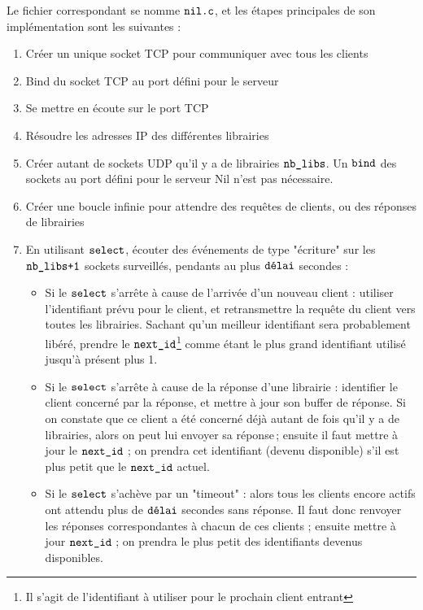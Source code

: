 \documentclass[
  french,
  twocolumn,
	9pt, %
]{fphw}
\begin{document}
\noindent Le fichier correspondant se nomme $\verb|nil.c|$, et les étapes principales de son implémentation sont les suivantes :

\begin{enumerate}
	\item Créer un unique socket TCP pour communiquer avec tous les clients
  \item Bind du socket TCP au port défini pour le serveur
  \item Se mettre en écoute sur le port TCP
  \item Résoudre les adresses IP des différentes librairies
  \item Créer autant de sockets UDP qu'il y a de librairies $\verb|nb_libs|$. Un $\verb|bind|$ des sockets au port défini pour le serveur Nil n'est pas nécessaire.
  \item Créer une boucle infinie pour attendre des requêtes de clients, ou des réponses de librairies 
	\item En utilisant $\verb|select|$, écouter des événements de type "écriture" sur les $\verb|nb_libs+1|$ sockets surveillés, pendants au plus $\verb|délai|$ secondes :
	\begin{itemize}
		\item Si le $\verb|select|$ s'arrête à cause de l'arrivée d'un nouveau client : utiliser l'identifiant prévu pour le client, et retransmettre la requête du client vers toutes les librairies. Sachant qu'un meilleur identifiant sera probablement libéré, prendre le $\verb|next_id|$\footnote{Il s'agit de l'identifiant à utiliser pour le prochain client entrant} comme étant le plus grand identifiant utilisé jusqu'à présent plus 1.
		\item Si le $\verb|select|$ s'arrête à cause de la réponse d'une librairie : identifier le client concerné par la réponse, et mettre à jour son buffer de réponse. Si on constate que ce client a été concerné déjà autant de fois qu'il y a de librairies, alors on peut lui envoyer sa réponse ; ensuite il faut mettre à jour le $\verb|next_id|$ ; on prendra cet identifiant (devenu disponible) s'il est plus petit que le $\verb|next_id|$ actuel.
		\item Si le $\verb|select|$ s'achève par un "timeout" : alors tous les clients encore actifs ont attendu plus de $\verb|délai|$ secondes sans réponse. Il faut donc renvoyer les réponses correspondantes à chacun de ces clients ; ensuite mettre à jour $\verb|next_id|$ ; on prendra le plus petit des identifiants devenus disponibles. 
	\end{itemize}
\end{enumerate}
\end{document}
